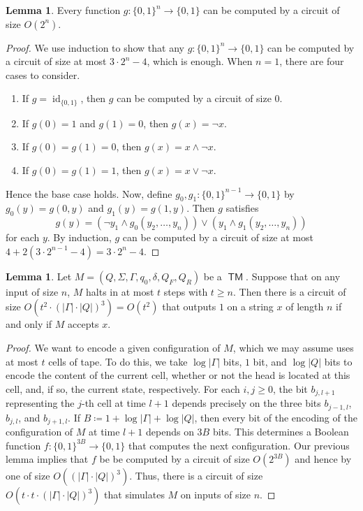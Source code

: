 \documentclass[10pt,letterpaper,cm]{nupset}
\theoremstyle{definition}
\theoremstyle{theorem}
\newtheorem{lemma}[definition]{Lemma}
\theoremstyle{remark}
\newcommand{\1}{\mathbf{1}}
\newcommand{\0}{\vec 0}
\DeclareMathOperator{\id}{id}
\DeclareMathOperator{\TM}{\mathsf{TM}}
\begin{document}
\begin{lemma}
Every function $g: \{0,1\}^n \to \{0,1\}$ can be computed by a circuit of size $O(2^n)$. 
\end{lemma}
\begin{proof}
We use induction to show that any $g:\{0,1\}^n \to \{0,1\}$ can be computed by a circuit of size at most $3 \cdot 2^n -4$, which is enough. When $n=1$, there are four cases to consider.
\begin{enumerate}[label=(\alph*)]
\item If $g= \id_{\{0,1\}}$, then $g$ can be computed by a circuit of size $0$.
\item If $g(0) =1$ and $g(1) =0$, then $g(x) = \neg x$.
\item If $g(0) = g(1) = 0$, then $g(x) = x \land \neg x$.
\item If $g(0) = g(1) = 1$, then $g(x) = x \vee \neg x$.
\end{enumerate}
Hence the base case holds. Now, define $g_0, g_1 : \{0,1 \}^{n-1} \to \{0,1\}$ by $g_0(y) = g(0, y)$ and $g_1(y) = g(1,y)$. Then $g$ satisfies $$g(y) = (\neg y_1 \land g_0(y_2, \ldots, y_n)) \vee (y_1 \land g_1(y_2, \ldots, y_n))$$ for each $y$. By induction, $g$ can be computed by a circuit of size at most $4 + 2(3 \cdot 2^{n-1} -4) = 3 \cdot 2^n -4$. 
\end{proof}

\begin{lemma}
Let $M= (Q, \Sigma, \Gamma, q_0, \delta, Q_F, Q_R)$ be a $\TM$. Suppose that on any input of size $n$, $M$ halts in at most $t$ steps with $t\geq n$. Then there is a circuit of size $O(t^2 \cdot (|\Gamma|\cdot |Q|)^3) = O(t^2)$ that  outputs $1$ on a  string $x$ of length $n$ if and only if $M$ accepts $x$.
\end{lemma}
\begin{proof}
We want to encode a given configuration of $M$, which we may assume uses at most $t$ cells of tape. To do this, we take $\log{|\Gamma|}$ bits, $1$ bit, and $\log{|Q|}$ bits to encode the content of the current cell, whether or not the head is located at this cell, and, if so, the current state, respectively.  For each $i,j\geq0$, the bit $b_{j, l+1}$ representing the $j$-th cell at time $l+1$ depends precisely on the three bits $b_{j-1, l}$, $b_{j, l}$, and $b_{j+1, l}$. If $B\coloneqq 1+ \log{|\Gamma|} +\log{|Q|}$, then every bit of the encoding of the configuration of $M$ at time $l+1$ depends on $3B$ bits. This determines a Boolean function $f: \{0,1\}^{3B}\to \{0,1\}$ that computes the next configuration. Our previous lemma implies that $f$ be be computed by a circuit of size $O(2^{3B})$ and hence by one of size $O((|\Gamma|\cdot |Q|)^3)$. Thus, there is a circuit of size $O(t\cdot t\cdot  (|\Gamma| \cdot |Q|)^3 )$ that simulates $M$ on inputs of size $n$.
\end{proof}
\end{document}
